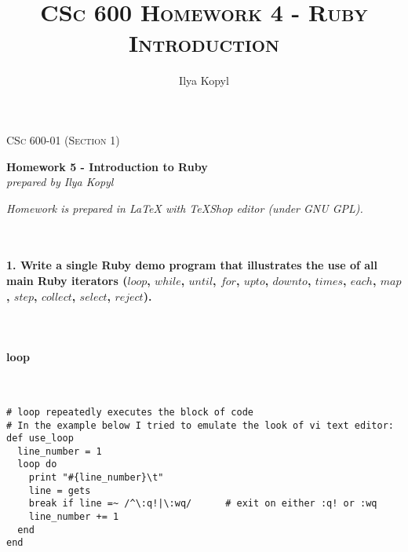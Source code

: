 \documentclass{article}
\author{Ilya Kopyl}
\begin{document}
	\setlength{\grammarparsep}{5pt plus 1pt minus 1pt} %
	\setlength{\grammarindent}{13em} %




	\begin{titlepage}
		\begin{center}
				\Large\textsc{CSc 600-01 (Section 1)}
				
				\Large\textbf{Homework 5 - Introduction to Ruby}\\

				\Large\textit{prepared by Ilya Kopyl}
				
		\end{center}	
	\end{titlepage}


	\title{\textsc{CSc 600 Homework 4 - Ruby Introduction}}	
	\maketitle
	
		\noindent \textit{Homework is prepared in LaTeX with TeXShop editor (under GNU GPL).}

	\rmfamily\




	\paragraph{1. Write a single Ruby demo program that illustrates the use of all main Ruby iterators (\(loop\), \(while\), \(until\), \(for\), \(upto\), \(downto\), \(times\), \(each\), \(map\), \(step\), \(collect\), \(select\), \(reject\)).}\

\paragraph{ loop}\

\begin{verbatim}
# loop repeatedly executes the block of code
# In the example below I tried to emulate the look of vi text editor:
def use_loop
  line_number = 1
  loop do
    print "#{line_number}\t"
    line = gets
    break if line =~ /^\:q!|\:wq/      # exit on either :q! or :wq
    line_number += 1
  end
end
\end{verbatim}
\end{document}
